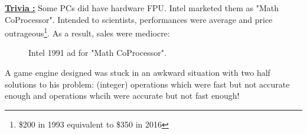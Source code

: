 \documentclass[book.tex]{subfiles}
\begin{document}
\textbf{\underline{Trivia :}} Some PCs did have hardware FPU. Intel marketed them as "Math CoProcessor". Intended to scientists, performances were average and price outrageous\footnote{\$200 in 1993 equivalent to \$350 in 2016}. As a result, sales were mediocre:\\
\begin{figure}[H]
\centering
\caption{Intel 1991 ad for "Math CoProcessor".}
\label{fig:fp_internals}
\end{figure}



\par
A game engine designed was stuck in an awkward situation with two half solutions to his problem: (integer) operations which were fast but not accurate enough and  operations whcih were accurate but not fast enough!
  
\end{document}
